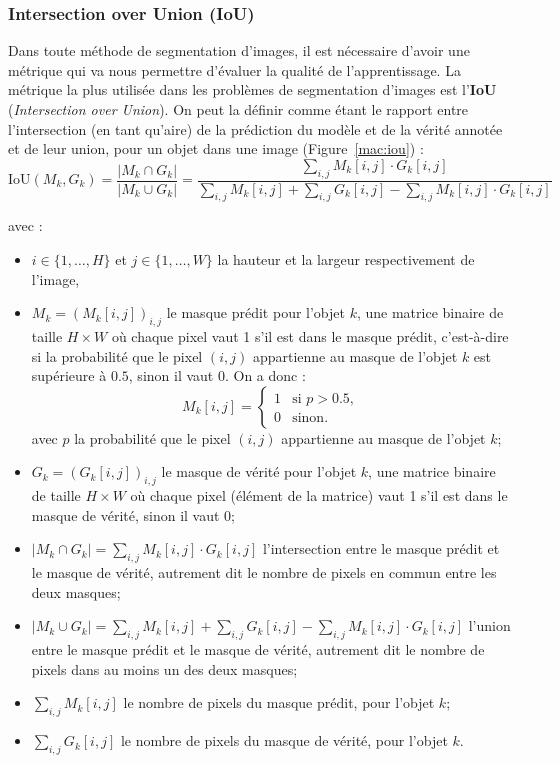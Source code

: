 \documentclass[a4paper,12pt]{report}
\newcommand{\figref}[1]{Figure~\ref{#1}}
\begin{document}
\subsubsection{Intersection over Union (IoU)}


Dans toute méthode de segmentation d'images, il est nécessaire d'avoir une métrique qui va nous permettre d'évaluer la qualité de l'apprentissage. La métrique la plus utilisée dans les problèmes de segmentation d'images est l'\textbf{IoU} (\textit{Intersection over Union}). On peut la définir comme étant le rapport entre l'intersection (en tant qu'aire) de la prédiction du modèle et de la vérité annotée et de leur union, pour un objet dans une image (\figref{mac:iou}) :
$$\text{IoU}(M_k, G_k) = \frac{\lvert M_k \cap G_k\rvert}{\lvert M_k \cup G_k\rvert}= \frac{\displaystyle\sum_{i,j}M_k[i,j]\cdot G_k[i,j]}{\displaystyle\sum_{i,j}M_k[i,j]+ \displaystyle\sum_{i,j}G_k[i,j] - \displaystyle\sum_{i,j}M_k[i,j]\cdot G_k[i,j]}$$

\noindent avec :
\begin{itemize}
    \item $i\in \{1, \ldots, H\}$ et $j\in \{1, \ldots, W\}$ la hauteur et la largeur respectivement de l'image,
    \item $M_k = \left(M_k[i,j]\right)_{i,j}$ le masque prédit pour l'objet $k$, une matrice binaire de taille $H\times W$ où chaque pixel vaut 1 s'il est dans le masque prédit, c'est-à-dire si la probabilité que le pixel $(i,j)$ appartienne au masque de l'objet $k$ est supérieure à $0.5$, sinon il vaut 0. On a donc :
          $$M_k[i,j] = \begin{cases}
                  1 & \text{si } p > 0.5, \\
                  0 & \text{sinon}.
              \end{cases}$$
          avec $p$ la probabilité que le pixel $(i,j)$ appartienne au masque de l'objet $k$;
    \item $G_k=\left(G_k[i,j]\right)_{i,j}$ le masque de vérité pour l'objet $k$, une matrice binaire de taille $H\times W$ où chaque pixel (élément de la matrice) vaut 1 s'il est dans le masque de vérité, sinon il vaut 0;
    \item $\lvert M_k \cap G_k\rvert = \sum_{i,j}M_k[i,j]\cdot G_k[i,j]$ l'intersection entre le masque prédit et le masque de vérité, autrement dit le nombre de pixels en commun entre les deux masques;
    \item $\lvert M_k \cup G_k\rvert = \sum_{i,j}M_k[i,j]+ \sum_{i,j}G_k[i,j] - \sum_{i,j}M_k[i,j]\cdot G_k[i,j] $ l'union entre le masque prédit et le masque de vérité, autrement dit le nombre de pixels dans au moins un des deux masques;
    \item $\sum_{i,j}M_k[i,j]$ le nombre de pixels du masque prédit, pour l'objet $k$;
    \item $\sum_{i,j}G_k[i,j]$ le nombre de pixels du masque de vérité, pour l'objet $k$.
\end{itemize}
\end{document}

